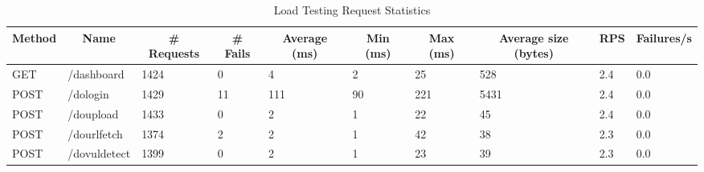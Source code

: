 \begin{table*}[h]
  \caption{Load Testing Request Statistics}
  \label{tab:loadreqstat}
  \begin{tabular}{|l|l|l|l|l|l|l|l|l|l|}
    \hline
    \multicolumn{1}{|c|}{\textbf{Method}} & \multicolumn{1}{c|}{\textbf{Name}} & \multicolumn{1}{c|}{\textbf{\# Requests}} & \multicolumn{1}{c|}{\textbf{\# Fails}} & \multicolumn{1}{c|}{\textbf{Average (ms)}} & \multicolumn{1}{c|}{\textbf{Min (ms)}} & \multicolumn{1}{c|}{\textbf{Max (ms)}} & \multicolumn{1}{c|}{\textbf{Average size (bytes)}} & \multicolumn{1}{c|}{\textbf{RPS}} & \multicolumn{1}{c|}{\textbf{Failures/s}} \\ \hline
    GET                                   & /dashboard                         & 1424                                      & 0                                      & 4                                          & 2                                      & 25                                     & 528                                                & 2.4                               & 0.0                                      \\ \hline
    {\color[HTML]{2A2B2E} POST}           & /dologin                           & 1429                                      & 11                                     & 111                                        & 90                                     & 221                                    & 5431                                               & 2.4                               & 0.0                                      \\ \hline
    {\color[HTML]{2A2B2E} POST}           & /doupload                          & 1433                                      & 0                                      & 2                                          & 1                                      & 22                                     & 45                                                 & 2.4                               & 0.0                                      \\ \hline
    POST                                  & /dourlfetch                        & 1374                                      & 2                                      & 2                                          & 1                                      & 42                                     & 38                                                 & 2.3                               & 0.0                                      \\ \hline
    POST                                  & /dovuldetect                       & 1399                                      & 0                                      & 2                                          & 1                                      & 23                                     & 39                                                 & 2.3                               & 0.0                                      \\ \hline

\end{tabular}
\end{table*}
